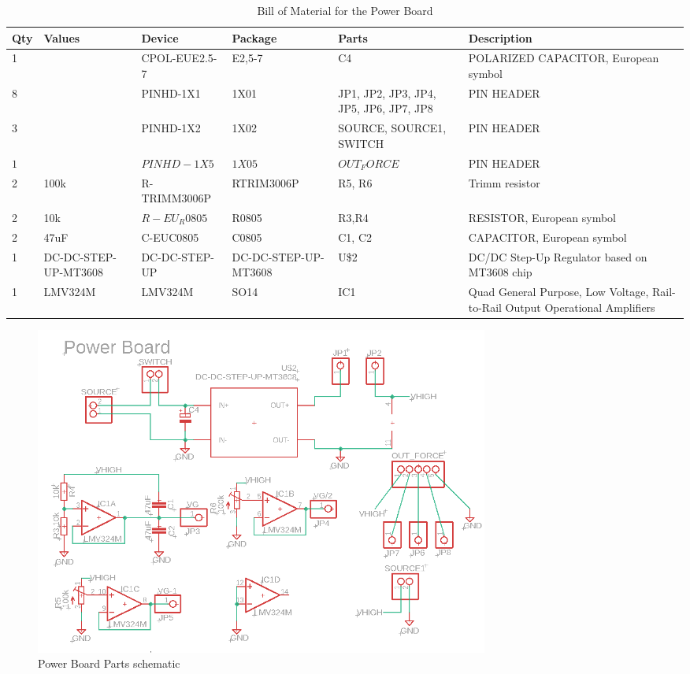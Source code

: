 \documentclass[12 pt, a4paper]{thesis}
\begin{document}
\begin{table}[hbt!]
\begin{center}
\begin{tabular}{| m{0.3cm} | m{2cm} | m{3.2cm} | m{2.6cm} | m{2.4cm} | m{3cm} |}
\hline
Qty & Values & Device & Package & Parts & Description\\
\hline
1 & & CPOL-EUE2.5-7 & E2,5-7 &C4 & POLARIZED CAPACITOR, European symbol\\
\hline
8 & & PINHD-1X1 & 1X01 & JP1, JP2, JP3, JP4, JP5, JP6, JP7, JP8 & PIN HEADER\\
\hline
3 & & PINHD-1X2 & 1X02 & SOURCE, SOURCE1, SWITCH & PIN HEADER\\
\hline
$1$ & & $PINHD-1X5$ & $1X05$ & $OUT_FORCE$ & PIN HEADER \\
\hline
2 & 100k & R-TRIMM3006P & RTRIM3006P & R5, R6 & Trimm resistor\\
\hline       
2 & 10k & $R-EU_R0805$ & R0805 & R3,R4 & RESISTOR, European symbol\\
\hline
2 & 47uF & C-EUC0805 & C0805 & C1, C2 & CAPACITOR, European symbol\\
\hline
1 & DC-DC-STEP-UP-MT3608 & DC-DC-STEP-UP & DC-DC-STEP-UP-MT3608 & U\$2 & DC/DC Step-Up Regulator based on MT3608 chip\\
\hline
1 & LMV324M & LMV324M & SO14 & IC1 & Quad General Purpose, Low Voltage, Rail-to-Rail Output Operational Amplifiers                                    \\
\hline
\end{tabular} 
\caption{Bill of Material for the Power Board}
\end{center}
\end{table}
\begin{figure}[hbt!]
\begin{center}
\includegraphics[width = 150mm]{PowerSch.png}
\caption{Power Board Parts schematic}
\end{center}
\end{figure}
\end{document}
